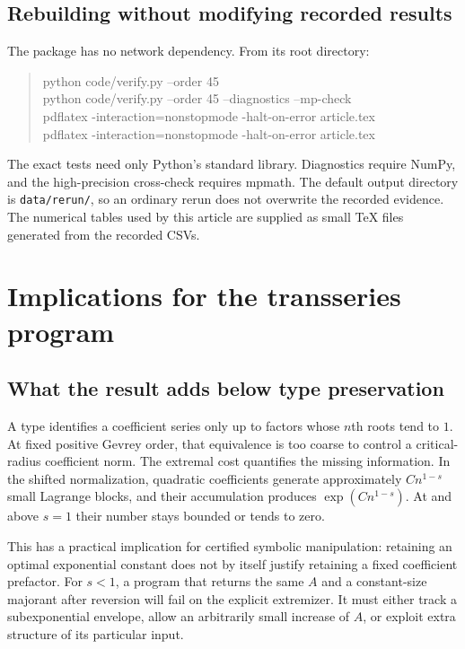 \documentclass[11pt,a4paper]{article}
\theoremstyle{definition}
\theoremstyle{remark}
\numberwithin{equation}{section}
\begin{document}
\subsection{Rebuilding without modifying recorded results}
The package has no network dependency. From its root directory:
\begin{quote}\small\ttfamily
python code/verify.py --order 45\\
python code/verify.py --order 45 --diagnostics --mp-check\\
pdflatex -interaction=nonstopmode -halt-on-error article.tex\\
pdflatex -interaction=nonstopmode -halt-on-error article.tex
\end{quote}
The exact tests need only Python's standard library. Diagnostics require
NumPy, and the high-precision cross-check requires mpmath. The default
output directory is \texttt{data/rerun/}, so an ordinary rerun does not
overwrite the recorded evidence. The numerical tables used by this
article are supplied as small TeX files generated from the recorded CSVs.

\section{Implications for the transseries program}\label{sec:implications}

\subsection{What the result adds below type preservation}
A type identifies a coefficient series only up to factors whose $n$th
roots tend to $1$. At fixed positive Gevrey order, that equivalence is
too coarse to control a critical-radius coefficient norm. The extremal
cost quantifies the missing information. In the shifted normalization,
quadratic coefficients generate approximately $Cn^{1-s}$ small
Lagrange blocks, and their accumulation produces $\exp(Cn^{1-s})$.
At and above $s=1$ their number stays bounded or tends to zero.

This has a practical implication for certified symbolic manipulation:
retaining an optimal exponential constant does not by itself justify
retaining a fixed coefficient prefactor. For $s<1$, a program that
returns the same $A$ and a constant-size majorant after reversion will
fail on the explicit extremizer. It must either track a subexponential
envelope, allow an arbitrarily small increase of $A$, or exploit extra
structure of its particular input.
\end{document}
